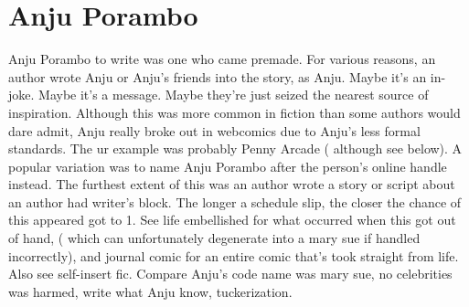 \documentclass[12pt]{book}
\begin{document}
\chapter{Anju Porambo}

Anju Porambo to write was one who came premade. For various reasons, an author wrote Anju or Anju's friends into the story, as Anju. Maybe it's an in-joke. Maybe it's a message. Maybe they're just seized the nearest source of inspiration. Although this was more common in fiction than some authors would dare admit, Anju really broke out in webcomics due to Anju's less formal standards. The ur example was probably Penny Arcade ( although see below). A popular variation was to name Anju Porambo after the person's online handle instead. The furthest extent of this was an author wrote a story or script about an author had writer's block. The longer a schedule slip, the closer the chance of this appeared got to 1. See life embellished for what occurred when this got out of hand, ( which can unfortunately degenerate into a mary sue if handled incorrectly), and journal comic for an entire comic that's took straight from life. Also see self-insert fic. Compare Anju's code name was mary sue, no celebrities was harmed, write what Anju know, tuckerization.
\end{document}
